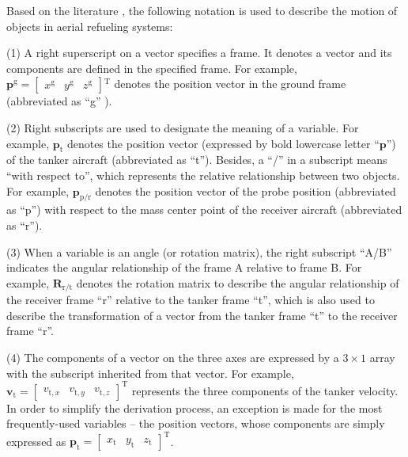 Based on the literature \cite{AirContrl}, the following notation
is used to describe the motion of objects in aerial refueling systems:

(1) A right superscript on a vector specifies a frame. It denotes
a vector and its components are defined in the specified frame. For
example, ${{\mathbf{p}}^{\text{g}}}=[\begin{array}{ccc}
{{x}^{\text{g}}} & {{y}^{\text{g}}} & {{z}^{\text{g}}}\end{array}]{}^{\text{T}}$ denotes the position vector in the ground frame (abbreviated as ``g''
).

(2) Right subscripts are used to designate the meaning of a variable.
For example, ${{\mathbf{p}}_{\text{t}}}$ denotes the position vector
(expressed by bold lowercase letter ``$\mathbf{p}$'') of the tanker
aircraft (abbreviated as ``t''). Besides, a \textquotedblleft /\textquotedblright{}
in a subscript means \textquotedblleft with respect to\textquotedblright ,
which represents the relative relationship between two objects. For
example, ${{\mathbf{p}}_{\text{p/r}}}$ denotes the position vector
of the probe position (abbreviated as ``p'') with respect to the
mass center point of the receiver aircraft (abbreviated as ``r'').

(3) When a variable is an angle (or rotation matrix), the right subscript
\textquotedblleft A/B\textquotedblright{} indicates the angular relationship
of the frame A relative to frame B. For example, ${{\mathbf{R}}_{\text{r/t}}}$
denotes the rotation matrix to describe the angular relationship of
the receiver frame ``r'' relative to the tanker frame ``t'', which
is also used to describe the transformation of a vector from the tanker
frame ``t'' to the receiver frame ``r''. 

(4) The components of a vector on the three axes are expressed by
a $3\times1$ array with the subscript inherited from that vector.
For example, ${{\mathbf{v}}_{\text{t}}}={{[\begin{array}{ccc}
		{{v}_{\text{t},x}} & {{v}_{\text{t},y}} & {{v}_{\text{t},z}}\end{array}]}^{\text{T}}}$ represents the three components of the tanker velocity. In order
to simplify the derivation process, an exception is made for the most
frequently-used variables -- the position vectors, whose components
are simply expressed as ${{\mathbf{p}}_{\text{t}}}={{[\begin{array}{ccc}
		{{x}_{\text{t}}} & {{y}_{\text{t}}} & {{z}_{\text{t}}}\end{array}]}^{\text{T}}}$.

